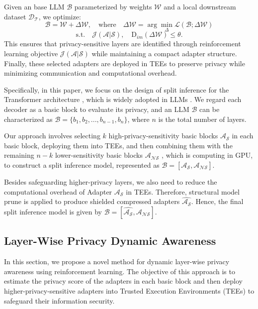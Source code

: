 \documentclass{article}
\begin{document}
Given an base LLM $\mathcal{B}$ parameterized by weights $\mathcal{W}$ and a local downstream dataset $\mathcal{D_T}$, we optimize:
\begin{equation}
\mathcal{B} = \mathcal{W} + \Delta\mathcal{W}, \quad \text{where} \quad \Delta\mathcal{W} = \arg\min_{\Delta} \mathcal{L}(\mathcal{B}; \Delta\mathcal{W})
\end{equation}
\begin{equation}
\text{s.t.} \quad \mathcal{J}(\mathcal{A}|\mathcal{S}), \quad \text{D}_{im}(\Delta\mathcal{W}) \leq \theta.
\end{equation}
This ensures that privacy-sensitive layers are identified through reinforcement learning objective $\mathcal{J}(\mathcal{A}|\mathcal{S})$ while maintaining a compact adapter structure.
Finally, these selected adapters are deployed in TEEs to preserve privacy while minimizing communication and computational overhead.

Specifically, in this paper, we focus on the design of split inference for the Transformer architecture \cite{vaswani2017attention}, which is widely adopted in LLMs \cite{han2022survey,chang2024survey}. We regard each decoder as a basic block to evaluate its privacy, and an LLM $\mathcal{B}$ can be characterized as $\mathcal{B} = \{b_1, b_2, ..., b_{n-1}, b_n\}$, where $n$ is the total number of layers. 

Our approach involves selecting $k$ high-privacy-sensitivity basic blocks $\mathcal{A_S}$ in each basic block, deploying them into TEEs, and then combining them with the remaining $n-k$ lower-sensitivity basic blocks $\mathcal{A_{NS}}$ , which is computing in GPU, to construct a split inference model, represented as $\mathcal{B} = [\mathcal{A_S}, \mathcal{A_{NS}}]$. 

Besides safeguarding higher-privacy layers, we also need to reduce the computational overhead of Adapter $\mathcal{A_S}$ in TEEs. Therefore, structural model prune is applied to produce shielded compressed adapters $\hat{\mathcal{A_S}}$. 
Hence, the final split inference model is given by $\mathcal{B} = [\hat{\mathcal{A_S}}, \mathcal{A_{NS}}]$.

\subsection{Layer-Wise Privacy Dynamic Awareness}
In this section, we propose a novel method for dynamic layer-wise privacy awareness using reinforcement learning. The objective of this approach is to estimate the privacy score of the adapters in each basic block and then deploy higher-privacy-sensitive adapters into Trusted Execution Environments (TEEs) to safeguard their information security.
\end{document}
